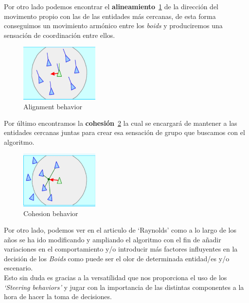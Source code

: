 Por otro lado podemos encontrar el \textbf{alineamiento}~\ref{img:alignment-b} de la
dirección del movimento propio con las de las entidades más cercanas, de esta forma conseguimos un
movimiento armónico entre los \textit{boids} y produciremos una sensación de
coordinación entre ellos.

\begin{figure}[ht]
\centering
\includegraphics[width=0.35\textwidth]{imagenes/marco_teo/alignment.png}
\caption{Alignment behavior}
\label{img:alignment-b}
\end{figure}

Por último encontramos la \textbf{cohesión}~\ref{img:cohesion-b} la cual se encargará de
mantener a las entidades cercanas juntas para crear esa sensación de grupo que buscamos
con el algoritmo.

\begin{figure}[ht]
\centering
\includegraphics[width=0.35\textwidth]{imagenes/marco_teo/cohesion.png}
\caption{Cohesion behavior}
\label{img:cohesion-b}
\end{figure}

Por otro lado, podemos ver en el articulo de `Raynolds' como a lo largo de los años se
ha ido modificando y ampliando el algoritmo con el fin de añadir variaciones en el
comportamiento y/o introducir más factores influyentes en la decisión de los 
\textit{Boids} como puede ser el olor de determinada entidad/es y/o escenario. \\
Esto sin duda es gracias a la versatílidad que nos proporciona el uso de los
\textit{`Steering behaviors'} y jugar con la importancia de las distintas componentes
a la hora de hacer la toma de decisiones.

